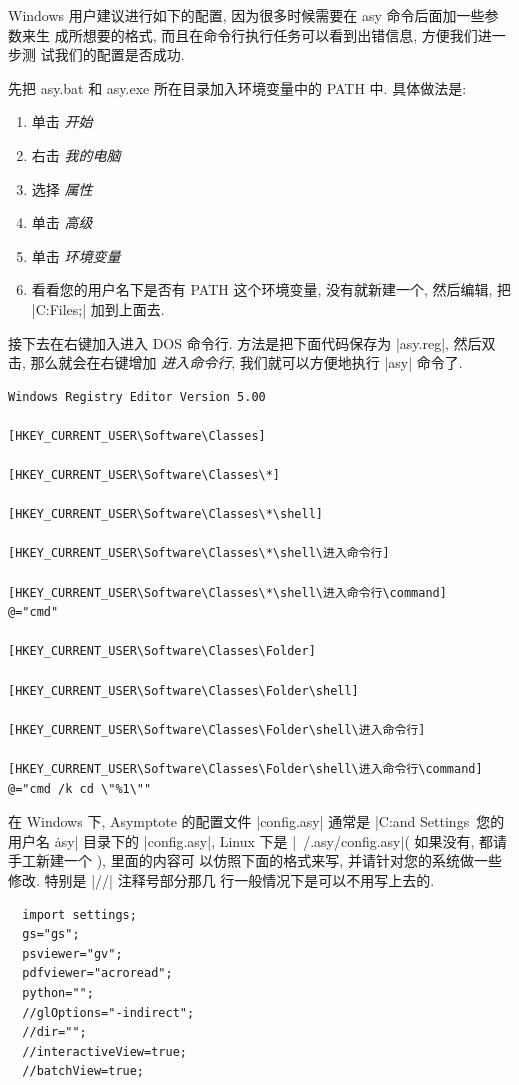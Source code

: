 \documentclass[nofonts,CJKnormalspaces]{ctexbook}[2009/05/20]
\begin{document}
Windows 用户建议进行如下的配置, 因为很多时候需要在 asy 命令后面加一些参数来生
成所想要的格式, 而且在命令行执行任务可以看到出错信息, 方便我们进一步测
试我们的配置是否成功.

先把 asy.bat 和 asy.exe 所在目录加入环境变量中的 PATH 中. 具体做法是:
\begin{enumerate}
\item  单击 \emph{开始}
\item 右击 \emph{我的电脑}
\item 选择 \emph{属性}
\item 单击 \emph{高级}
\item 单击 \emph{环境变量}
\item 看看您的用户名下是否有 PATH 这个环境变量, 没有就新建一个, 然后编辑, 把
  |C:\Program Files\Asymptote;| 加到上面去.
\end{enumerate}

接下去在右键加入进入 DOS 命令行.
\label{Windows:DOS}
方法是把下面代码保存为 |asy.reg|, 然后双击, 那么就会在右键增加
\emph{进入命令行}, 我们就可以方便地执行 |asy| 命令了.
\begin{verbatim}
Windows Registry Editor Version 5.00

[HKEY_CURRENT_USER\Software\Classes]

[HKEY_CURRENT_USER\Software\Classes\*]

[HKEY_CURRENT_USER\Software\Classes\*\shell]

[HKEY_CURRENT_USER\Software\Classes\*\shell\进入命令行]

[HKEY_CURRENT_USER\Software\Classes\*\shell\进入命令行\command]
@="cmd"

[HKEY_CURRENT_USER\Software\Classes\Folder]

[HKEY_CURRENT_USER\Software\Classes\Folder\shell]

[HKEY_CURRENT_USER\Software\Classes\Folder\shell\进入命令行]

[HKEY_CURRENT_USER\Software\Classes\Folder\shell\进入命令行\command]
@="cmd /k cd \"%1\""
\end{verbatim}

在 Windows 下, Asymptote 的配置文件 |config.asy| 通常是
|C:\Documents and Settings\ 您的用户名 \.asy| 目录下的 |config.asy|,
Linux 下是 |~/.asy/config.asy|( 如果没有, 都请手工新建一个 ), 里面的内容可
以仿照下面的格式来写, 并请针对您的系统做一些修改. 特别是 |//| 注释号部分那几
行一般情况下是可以不用写上去的.
\begin{lstlisting}
  import settings;
  gs="gs";
  psviewer="gv";
  pdfviewer="acroread";
  python="";
  //glOptions="-indirect";
  //dir="";
  //interactiveView=true;
  //batchView=true;
\end{lstlisting}
\end{document}
